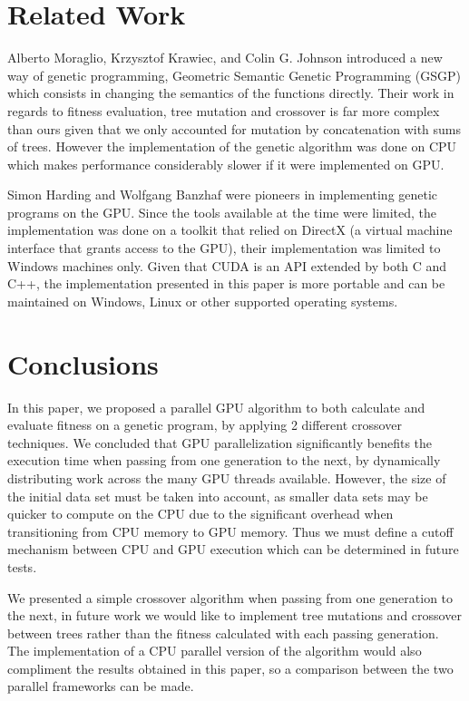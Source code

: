 \documentclass[runningheads]{llncs}
\begin{document}
\section{Related Work}

Alberto Moraglio, Krzysztof Krawiec, and Colin G. Johnson introduced a new way of genetic programming, Geometric Semantic Genetic Programming (GSGP) which consists in changing the semantics of the functions directly. Their work in regards to fitness evaluation, tree mutation and crossover is far more complex than ours given that we only accounted for mutation by concatenation with sums of trees. However the implementation of the genetic algorithm was done on CPU which makes performance considerably slower if it were implemented on GPU.

Simon Harding and Wolfgang Banzhaf were pioneers in implementing genetic programs on the GPU. Since the tools available at the time were limited, the implementation was done on a toolkit that relied on DirectX (a virtual machine interface that grants access to the GPU), their implementation was limited to Windows machines only. Given that CUDA is an API extended by both C and C++, the implementation presented in this paper is more portable and can be maintained on Windows, Linux or other supported operating systems.


\section{Conclusions}

In this paper, we proposed a parallel GPU algorithm to both calculate and evaluate fitness on a genetic program, by applying 2 different crossover techniques. We concluded that GPU parallelization significantly benefits the execution time when passing from one generation to the next, by dynamically distributing work across the many GPU threads available. However, the size of the initial data set must be taken into account, as smaller data sets may be quicker to compute on the CPU due to the significant overhead when transitioning from CPU memory to GPU memory. Thus we must define a cutoff mechanism between CPU and GPU execution which can be determined in future tests.

We presented a simple crossover algorithm when passing from one generation to the next, in future work we would like to implement tree mutations and crossover between trees rather than the fitness calculated with each passing generation. The implementation of a CPU parallel version of the algorithm would also compliment the results obtained in this paper, so a comparison between the two parallel frameworks can be made.
\end{document}
